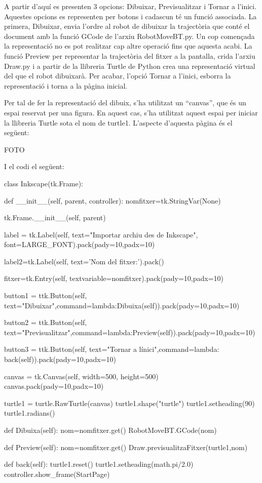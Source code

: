 A partir d’aquí es presenten 3 opcions: Dibuixar, Previsualitzar i Tornar a l’inici.  Aquestes opcions es representen per botons i cadascun té un funció associada. La primera, Dibuixar, envia l’ordre al robot de dibuixar la trajectòria que conté el document amb la funció GCode de l’arxiu RobotMoveBT.py. Un cop començada la representació no es pot realitzar cap altre operació fins que aquesta acabi. La funció Preview per representar la trajectòria del fitxer a la pantalla, crida l’arxiu Draw.py i a partir de la llibreria Turtle de Python crea una representació virtual del que el robot dibuixarà. Per acabar, l’opció Tornar a l’inici, esborra la representació i torna a la pàgina inicial. 

Per tal de fer la representació del dibuix, s’ha utilitzat un “canvas”, que és un espai reservat per una figura. En aquest cas, s’ha utilitzat aquest espai per iniciar la llibreria Turtle sota el nom de turtle1. L’aspecte d’aquesta pàgina és el següent:

FOTO 

I el codi el següent:

\begin{python}
	class Inkscape(tk.Frame):
	
		def __init__(self, parent, controller):
			nomfitxer=tk.StringVar(None)
			
			tk.Frame.__init__(self, parent)
			
			
			label = tk.Label(self, text="Importar archiu des de Inkscape", font=LARGE_FONT).pack(pady=10,padx=10)
			
			label2=tk.Label(self, text='Nom del fitxer:').pack()
			
			fitxer=tk.Entry(self, textvariable=nomfitxer).pack(pady=10,padx=10)
			
			button1 = ttk.Button(self, text="Dibuixar",command=lambda:Dibuixa(self)).pack(pady=10,padx=10)
			
			button2 = ttk.Button(self, text="Previsualitzar",command=lambda:Preview(self)).pack(pady=10,padx=10)
			
			button3 = ttk.Button(self, text="Tornar a l\'inici",command=lambda: back(self)).pack(pady=10,padx=10)
			
			canvas = tk.Canvas(self, width=500, height=500)
			canvas.pack(pady=10,padx=10)
			
			turtle1 = turtle.RawTurtle(canvas)
			turtle1.shape("turtle")
			turtle1.setheading(90)
			turtle1.radians()
		
		def Dibuixa(self):
			nom=nomfitxer.get()
			RobotMoveBT.GCode(nom)
		
		def Preview(self):
			nom=nomfitxer.get()
			Draw.previsualitzaFitxer(turtle1,nom)
			
		def back(self):
			turtle1.reset()
			turtle1.setheading(math.pi/2.0)
			controller.show_frame(StartPage)
\end{python}

